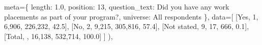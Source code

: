\documentclass[
  11pt,
  a4paper,
]{article}
\newenvironment{Shaded}{\begin{snugshade}}{\end{snugshade}}
\newcommand{\NormalTok}[1]{\textcolor[rgb]{0.00,0.23,0.31}{#1}}
\newcommand{\OperatorTok}[1]{\textcolor[rgb]{0.37,0.37,0.37}{#1}}
\newcommand{\StringTok}[1]{\textcolor[rgb]{0.13,0.47,0.30}{#1}}
\begin{document}
\begin{Shaded}
\begin{Highlighting}[]
\NormalTok{                meta}\OperatorTok{=}\NormalTok{\{}
                    \StringTok{\textquotesingle{}length\textquotesingle{}}\NormalTok{: }\StringTok{\textquotesingle{}1.0\textquotesingle{}}\NormalTok{, }\StringTok{\textquotesingle{}position\textquotesingle{}}\NormalTok{: }\StringTok{\textquotesingle{}13\textquotesingle{}}\NormalTok{,}
                    \StringTok{\textquotesingle{}question\_text\textquotesingle{}}\NormalTok{: }\StringTok{\textquotesingle{}Did you have any work placements as part of your program?\textquotesingle{}}\NormalTok{,}
                    \StringTok{\textquotesingle{}universe\textquotesingle{}}\NormalTok{: }\StringTok{\textquotesingle{}All respondents\textquotesingle{}}
\NormalTok{                \},}
\NormalTok{                data}\OperatorTok{=}\NormalTok{[}
\NormalTok{                    [}\StringTok{\textquotesingle{}Yes\textquotesingle{}}\NormalTok{, }\StringTok{\textquotesingle{}1\textquotesingle{}}\NormalTok{, }\StringTok{\textquotesingle{}6,906\textquotesingle{}}\NormalTok{, }\StringTok{\textquotesingle{}226,232\textquotesingle{}}\NormalTok{, }\StringTok{\textquotesingle{}42.5\textquotesingle{}}\NormalTok{],}
\NormalTok{                    [}\StringTok{\textquotesingle{}No\textquotesingle{}}\NormalTok{, }\StringTok{\textquotesingle{}2\textquotesingle{}}\NormalTok{, }\StringTok{\textquotesingle{}9,215\textquotesingle{}}\NormalTok{, }\StringTok{\textquotesingle{}305,816\textquotesingle{}}\NormalTok{, }\StringTok{\textquotesingle{}57.4\textquotesingle{}}\NormalTok{],}
\NormalTok{                    [}\StringTok{\textquotesingle{}Not stated\textquotesingle{}}\NormalTok{, }\StringTok{\textquotesingle{}9\textquotesingle{}}\NormalTok{, }\StringTok{\textquotesingle{}17\textquotesingle{}}\NormalTok{, }\StringTok{\textquotesingle{}666\textquotesingle{}}\NormalTok{, }\StringTok{\textquotesingle{}0.1\textquotesingle{}}\NormalTok{],}
\NormalTok{                    [}\StringTok{\textquotesingle{}Total\textquotesingle{}}\NormalTok{, }\StringTok{\textquotesingle{}\textquotesingle{}}\NormalTok{, }\StringTok{\textquotesingle{}16,138\textquotesingle{}}\NormalTok{, }\StringTok{\textquotesingle{}532,714\textquotesingle{}}\NormalTok{, }\StringTok{\textquotesingle{}100.0\textquotesingle{}}\NormalTok{]}
\NormalTok{                ]}
\NormalTok{            ),}
            

\end{Highlighting}
\end{Shaded}
\end{document}
